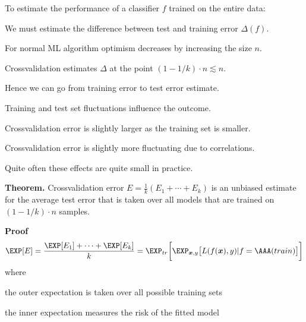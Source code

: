 \documentclass[landscape,footrule]{foils}
\renewcommand{\vec}[1]{\boldsymbol{#1}}
\begin{document}
To estimate the performance of a classifier $f$ trained on the entire data:
\begin{triangles}
\item We must estimate the difference between test and training error $\Delta(f)$.
\item For normal ML algorithm optimism decreases by increasing the size $n$.
\item Crossvalidation estimates $\Delta$ at the point $(1-1/k)\cdot n \lesssim n$. 
\item Hence we can go from training error to test error estimate.
\item Training and test set fluctuations influence the outcome.  
\end{triangles}
 


\vspace*{-.5cm}
\begin{triangles}
\item Crossvalidation error is slightly larger as the training set is smaller.  
\item Crossvalidation error is slightly more fluctuating due to correlations. 
\item Quite often these effects are quite small in practice. 
\end{triangles}




\textbf{Theorem.} 
Crossvalidation error $E =\frac{1}{k}(E_1+\cdots+E_k)$ is an 
unbiased estimate for the average test error that is taken over all models that are trained on $(1-1/k)\cdot n$ samples. 

\textbf{Proof}
\begin{align*}
\EXP[E] =\frac{\EXP[E_1]+\cdots+\EXP[E_k]}{k}=\EXP_{tr}\biggl[\EXP_{\vec{x}, y}\bigl[L(f(\vec{x}),y)|f=\AAA(train)\bigr]\biggr]
\end{align*}
where 
\begin{triangles}
\item the outer expectation is taken over all possible training sets  
\item the inner expectation measures the risk of the fitted model
\end{triangles}


\end{document}
